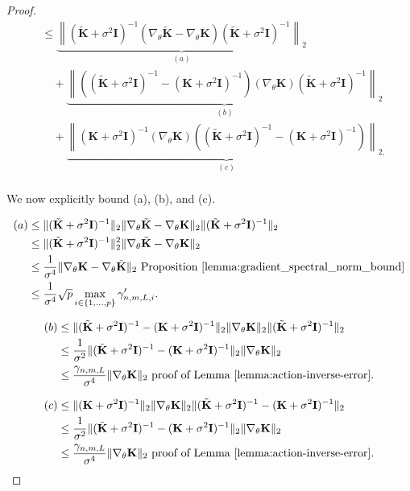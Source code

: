 \begin{proof}
\begin{align*}
    &\leq \underbrace{\left\| (\tilde{\mathbf{K}} + \sigma^2 \mathbf{I})^{-1} (\nabla_\theta \tilde{\mathbf{K}} - \nabla_\theta \mathbf{K}) (\tilde{\mathbf{K}} + \sigma^2 \mathbf{I})^{-1} \right\|_{2}}_{(a)} \\
    &\quad + \underbrace{\left\| \left((\tilde{\mathbf{K}} + \sigma^2 \mathbf{I})^{-1} - (\mathbf{K} + \sigma^2 \mathbf{I})^{-1}\right)(\nabla_\theta \mathbf{K}) (\tilde{\mathbf{K}} + \sigma^2 \mathbf{I})^{-1} \right\|_{2}}_{(b)} \\
    &\quad + \underbrace{\left\|(\mathbf{K} + \sigma^2 \mathbf{I})^{-1}(\nabla_\theta \mathbf{K})\left((\tilde{\mathbf{K}} + \sigma^2 \mathbf{I})^{-1} - (\mathbf{K} + \sigma^2 \mathbf{I})^{-1}\right) \right\|_{2, }}_{(c)}\\
\end{align*}

We now explicitly bound (a), (b), and (c).

\begin{align*}
(a) &\leq \| (\tilde{\mathbf{K}} + \sigma^2 \mathbf{I})^{-1} \|_2 \| \nabla_\theta \tilde{\mathbf{K}} - \nabla_\theta \mathbf{K} \|_2 \| (\tilde{\mathbf{K}} + \sigma^2 \mathbf{I})^{-1} \|_2\\
&\leq \| (\tilde{\mathbf{K}} + \sigma^2 \mathbf{I})^{-1} \|_2^2 \| \nabla_\theta \tilde{\mathbf{K}} - \nabla_\theta \mathbf{K} \|_2 \\
&\leq \frac{1}{\sigma^4} \| \nabla_\theta \mathbf{K} - \nabla_\theta \tilde{\mathbf{K}} \|_2\text{ Proposition }\ref{lemma:gradient_spectral_norm_bound}\\
&\leq  \frac{1}{\sigma^4}\sqrt{p} \max_{i \in \{1,\ldots,p\}} \gamma'_{n,m,L,i}.
\end{align*}

\begin{align*}
(b) &\leq \|(\tilde{\mathbf{K}} + \sigma^2 \mathbf{I})^{-1} - (\mathbf{K} + \sigma^2 \mathbf{I})^{-1}\|_2 \|\nabla_\theta \mathbf{K}\|_2 \|(\tilde{\mathbf{K}} + \sigma^2 \mathbf{I})^{-1}\|_2 \\
&\leq \frac{1}{\sigma^2} \|(\tilde{\mathbf{K}} + \sigma^2 \mathbf{I})^{-1} - (\mathbf{K} + \sigma^2 \mathbf{I})^{-1}\|_2 \|\nabla_\theta \mathbf{K}\|_2 \\
&\leq \frac{\gamma_{n,m,L}}{\sigma^4} \|\nabla_\theta \mathbf{K}\|_2\text{ proof of Lemma \ref{lemma:action-inverse-error}}.
\end{align*}

\begin{align*}
(c) &\leq \|(\mathbf{K} + \sigma^2 \mathbf{I})^{-1}\|_2 \|\nabla_\theta \mathbf{K}\|_2 \|(\tilde{\mathbf{K}} + \sigma^2 \mathbf{I})^{-1} - (\mathbf{K} + \sigma^2 \mathbf{I})^{-1}\|_2 \\
&\leq \frac{1}{\sigma^2} \|(\tilde{\mathbf{K}} + \sigma^2 \mathbf{I})^{-1} - (\mathbf{K} + \sigma^2 \mathbf{I})^{-1}\|_2 \|\nabla_\theta \mathbf{K}\|_2 \\
&\leq \frac{\gamma_{n,m,L}}{\sigma^4} \|\nabla_\theta \mathbf{K}\|_2\text{ proof of Lemma \ref{lemma:action-inverse-error}}.
\end{align*}


\end{proof}

